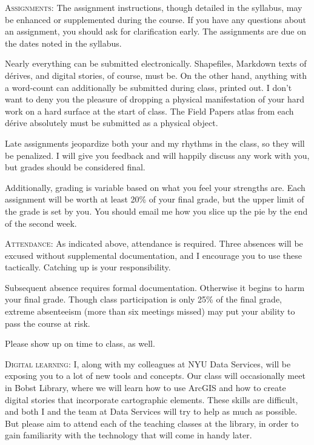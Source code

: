 \begin{description}

  \item \textsc{Assignments:} The assignment instructions, though detailed in
    the syllabus, may be enhanced or supplemented during the course. If you
    have any questions about an assignment, you should ask for clarification
    early. The assignments are due on the dates noted in the syllabus. 
    
    Nearly everything can be submitted electronically. Shapefiles, Markdown
    texts of dérives, and digital stories, of course, must be. On the other
    hand, anything with a word-count can additionally be submitted during
    class, printed out. I don’t want to deny you the pleasure of dropping a
    physical manifestation of your hard work on a hard surface at the start of
    class. The Field Papers atlas from each dérive absolutely must be submitted
    as a physical object. 
    
    Late assignments jeopardize both your and my rhythms in the class, so they
    will be penalized. I will give you feedback and will happily discuss any
    work with you, but grades should be considered final.

    Additionally, grading is variable based on what you feel your strengths are.
    Each assignment will be worth at least 20\% of your final grade, but the upper
    limit of the grade is set by you. You should email me how you slice up the
    pie by the end of the second week.

  \item \textsc{Attendance:} As indicated above, attendance is required. Three
    absences will be excused without supplemental documentation, and I
    encourage you to use these tactically. Catching up is your responsibility.

    Subsequent absence requires formal documentation. Otherwise it begins to
    harm your final grade. Though class participation is only 25\% of the final
    grade, extreme absenteeism (more than six meetings missed) may put your
    ability to pass the course at risk.

    Please show up on time to class, as well.

  \item \textsc{Digital learning:} I, along with my colleagues at NYU Data
    Services, will be exposing you to a lot of new tools and concepts. Our
    class will occasionally meet in Bobst Library, where we will learn how to
    use ArcGIS and how to create digital stories that incorporate cartographic
    elements. These skills are difficult, and both I and the team at Data
    Services will try to help as much as possible. But please aim to attend
    each of the teaching classes at the library, in order to gain familiarity
    with the technology that will come in handy later.


\end{description}
